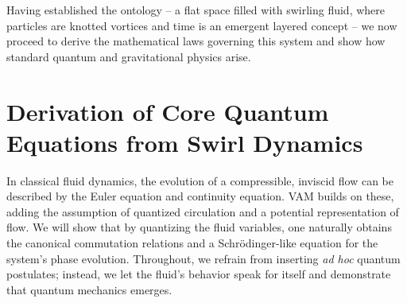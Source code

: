 \documentclass[a4paper,12pt]{article}
\begin{document}
    Having established the ontology -- a flat space filled with swirling fluid, where particles are knotted vortices and time is an emergent layered concept -- we now proceed to derive the mathematical laws governing this system and show how standard quantum and gravitational physics arise.

\section{Derivation of Core Quantum Equations from Swirl Dynamics}
    In classical fluid dynamics, the evolution of a compressible, inviscid flow can be described by the Euler equation and continuity equation. VAM builds on these, adding the assumption of quantized circulation and a potential representation of flow. We will show that by quantizing the fluid variables, one naturally obtains the canonical commutation relations and a Schrödinger-like equation for the system’s phase evolution. Throughout, we refrain from inserting \emph{ad hoc} quantum postulates; instead, we let the fluid’s behavior speak for itself and demonstrate that quantum mechanics emerges.
\end{document}
